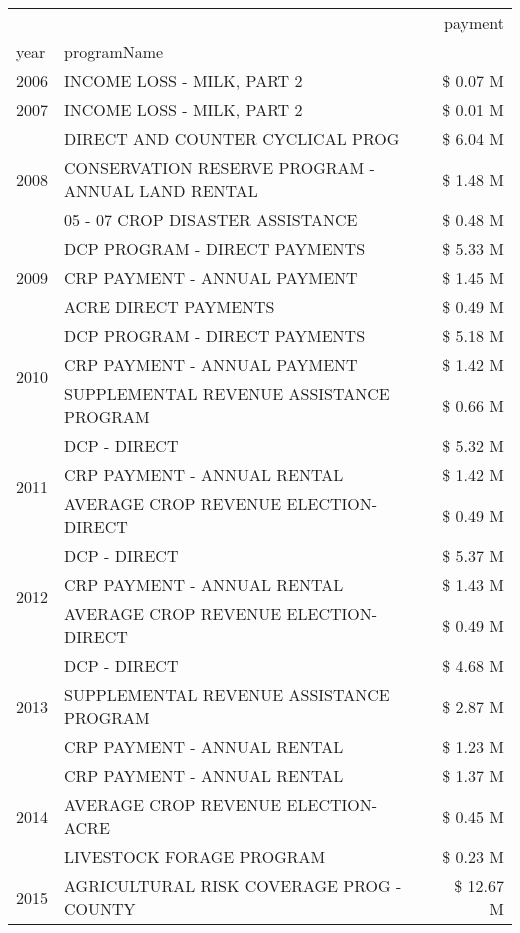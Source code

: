 \begin{tabular}{llr}
\toprule
 &  & payment \\
year & programName &  \\
\midrule
2006 & INCOME LOSS - MILK, PART 2 & \$ 0.07 M \\
\cline{1-3}
2007 & INCOME LOSS - MILK, PART 2 & \$ 0.01 M \\
\cline{1-3}
\multirow[t]{3}{*}{2008} & DIRECT AND COUNTER CYCLICAL PROG & \$ 6.04 M \\
 & CONSERVATION RESERVE PROGRAM - ANNUAL LAND RENTAL & \$ 1.48 M \\
 & 05 - 07 CROP DISASTER ASSISTANCE & \$ 0.48 M \\
\cline{1-3}
\multirow[t]{3}{*}{2009} & DCP PROGRAM - DIRECT PAYMENTS & \$ 5.33 M \\
 & CRP PAYMENT - ANNUAL PAYMENT & \$ 1.45 M \\
 & ACRE DIRECT PAYMENTS & \$ 0.49 M \\
\cline{1-3}
\multirow[t]{3}{*}{2010} & DCP PROGRAM - DIRECT PAYMENTS & \$ 5.18 M \\
 & CRP PAYMENT - ANNUAL PAYMENT & \$ 1.42 M \\
 & SUPPLEMENTAL REVENUE ASSISTANCE PROGRAM & \$ 0.66 M \\
\cline{1-3}
\multirow[t]{3}{*}{2011} & DCP - DIRECT & \$ 5.32 M \\
 & CRP PAYMENT - ANNUAL RENTAL & \$ 1.42 M \\
 & AVERAGE CROP REVENUE ELECTION-DIRECT & \$ 0.49 M \\
\cline{1-3}
\multirow[t]{3}{*}{2012} & DCP - DIRECT & \$ 5.37 M \\
 & CRP PAYMENT - ANNUAL RENTAL & \$ 1.43 M \\
 & AVERAGE CROP REVENUE ELECTION-DIRECT & \$ 0.49 M \\
\cline{1-3}
\multirow[t]{3}{*}{2013} & DCP - DIRECT & \$ 4.68 M \\
 & SUPPLEMENTAL REVENUE ASSISTANCE PROGRAM & \$ 2.87 M \\
 & CRP PAYMENT - ANNUAL RENTAL & \$ 1.23 M \\
\cline{1-3}
\multirow[t]{3}{*}{2014} & CRP PAYMENT - ANNUAL RENTAL & \$ 1.37 M \\
 & AVERAGE CROP REVENUE ELECTION-ACRE & \$ 0.45 M \\
 & LIVESTOCK FORAGE PROGRAM & \$ 0.23 M \\
\cline{1-3}
\multirow[t]{3}{*}{2015} & AGRICULTURAL RISK COVERAGE PROG - COUNTY & \$ 12.67 M \\

\end{tabular}
